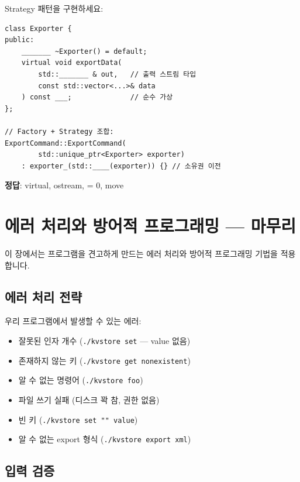 \documentclass[11pt,a4paper]{book}
\newcommand{\code}[1]{\texttt{#1}}
\begin{document}
\begin{quizbox}
Strategy 패턴을 구현하세요:

\begin{lstlisting}[style=cpp,numbers=none]
class Exporter {
public:
    _______ ~Exporter() = default;
    virtual void exportData(
        std::_______ & out,   // 출력 스트림 타입
        const std::vector<...>& data
    ) const ___;              // 순수 가상
};

// Factory + Strategy 조합:
ExportCommand::ExportCommand(
        std::unique_ptr<Exporter> exporter)
    : exporter_(std::____(exporter)) {} // 소유권 이전
\end{lstlisting}

\textbf{정답}: virtual, ostream, = 0, move
\end{quizbox}

\chapter{에러 처리와 방어적 프로그래밍 — 마무리}
\label{ch:error}

이 장에서는 프로그램을 견고하게 만드는 에러 처리와 방어적 프로그래밍 기법을 적용합니다.

\section{에러 처리 전략}

우리 프로그램에서 발생할 수 있는 에러:

\begin{itemize}[nosep]
\item 잘못된 인자 개수 (\code{./kvstore set} — value 없음)
\item 존재하지 않는 키 (\code{./kvstore get nonexistent})
\item 알 수 없는 명령어 (\code{./kvstore foo})
\item 파일 쓰기 실패 (디스크 꽉 참, 권한 없음)
\item 빈 키 (\code{./kvstore set "" value})
\item 알 수 없는 export 형식 (\code{./kvstore export xml})
\end{itemize}

\section{입력 검증}
\end{document}

